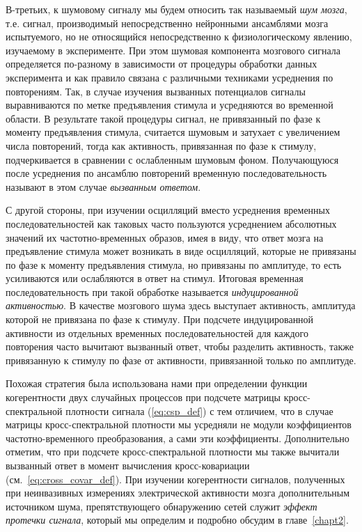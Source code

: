 В-третьих, к шумовому сигналу мы будем относить так называемый \emph{шум мозга}, т.е.
сигнал, производимый непосредственно нейронными ансамблями мозга испытуемого,
но не относящийся непосредственно к физиологическому явлению, изучаемому в эксперименте.
При этом шумовая компонента мозгового сигнала определяется по-разному в зависимости от
процедуры обработки данных эксперимента и как правило связана с различными техниками усреднения
по повторениям.
Так, в случае изучения вызванных потенциалов сигналы выравниваются по метке предъявления стимула и
усредняются во временной области. В результате такой процедуры сигнал, не привязанный по фазе к
моменту предъявления стимула, считается шумовым и затухает с увеличением числа повторений,
тогда как активность, привязанная по фазе к стимулу, подчеркивается в сравнении с ослабленным шумовым фоном.
Получающуюся после усреднения по ансамблю повторений временную
последовательность называют в этом случае \emph{вызванным ответом}.

С другой стороны, при изучении осцилляций вместо усреднения временных последовательностей как таковых
часто пользуются усреднением абсолютных значений их частотно-временных образов,
имея в виду, что ответ мозга на предъявление стимула может возникать в виде осцилляций,
которые не привязаны по фазе к моменту предъявления стимула,
но привязаны по амплитуде, то есть усиливаются или ослабляются в ответ на стимул.
Итоговая временная последовательность при такой обработке называется \emph{индуцированной активностью}.
В качестве мозгового шума здесь выступает активность, амплитуда которой не привязана по фазе к стимулу.
При подсчете индуцированной активности из отдельных временных последовательностей для каждого повторения
часто вычитают вызванный ответ, чтобы разделить активность, также привязанную к стимулу по фазе от активности,
привязанной только по амплитуде.

Похожая стратегия была использована нами при определении функции когерентности двух случайных процессов при
подсчете матрицы кросс-спектральной плотности сигнала (\ref{eq:csp_def}) с тем отличием,
что в случае матрицы кросс-спектральной плотности мы усредняли не модули коэффициентов
частотно-временного преобразования, а сами эти коэффициенты.
Дополнительно отметим, что при подсчете кросс-спектральной плотности мы также вычитали вызванный ответ в
момент вычисления кросс-ковариации (см.~\ref{eq:cross_covar_def}). При изучении когерентности сигналов,
полученных при неинвазивных измерениях электрической активности мозга дополнительным источником шума,
препятствующего обнаружению сетей служит \emph{эффект протечки сигнала}, который мы определим и подробно
обсудим в главе~\ref{chapt2}.

